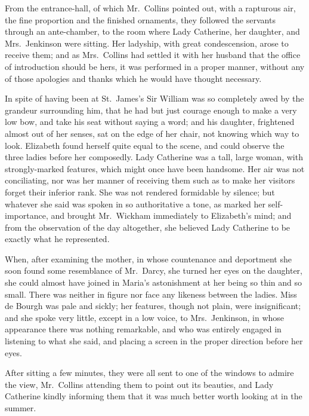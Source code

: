 \documentclass[12pt,english,oneside]{book}
\begin{document}
From the entrance-hall, of which Mr.\ Collins pointed out, with a
rapturous air, the fine proportion and the finished ornaments, they
followed the servants through an ante-chamber, to the room where Lady
Catherine, her daughter, and Mrs.\ Jenkinson were sitting. Her ladyship,
with great condescension, arose to receive them; and as Mrs.\ Collins
had settled it with her husband that the office of introduction should
be hers, it was performed in a proper manner, without any of those
apologies and thanks which he would have thought necessary.

In spite of having been at St.\ James's Sir William was so completely
awed by the grandeur surrounding him, that he had but just courage
enough to make a very low bow, and take his seat without saying a
word; and his daughter, frightened almost out of her senses, sat on
the edge of her chair, not knowing which way to look. Elizabeth found
herself quite equal to the scene, and could observe the three ladies
before her composedly. Lady Catherine was a tall, large woman, with
strongly-marked features, which might once have been handsome. Her
air was not conciliating, nor was her manner of receiving them such
as to make her visitors forget their inferior rank. She was not rendered
formidable by silence; but whatever she said was spoken in so authoritative
a tone, as marked her self-importance, and brought Mr.\ Wickham immediately
to Elizabeth's mind; and from the observation of the day altogether,
she believed Lady Catherine to be exactly what he represented.

When, after examining the mother, in whose countenance and deportment
she soon found some resemblance of Mr.\ Darcy, she turned her eyes
on the daughter, she could almost have joined in Maria's astonishment
at her being so thin and so small. There was neither in figure nor
face any likeness between the ladies. Miss de Bourgh was pale and
sickly; her features, though not plain, were insignificant; and she
spoke very little, except in a low voice, to Mrs.\ Jenkinson, in
whose appearance there was nothing remarkable, and who was entirely
engaged in listening to what she said, and placing a screen in the
proper direction before her eyes.

After sitting a few minutes, they were all sent to one of the windows
to admire the view, Mr.\ Collins attending them to point out its
beauties, and Lady Catherine kindly informing them that it was much
better worth looking at in the summer.
\end{document}

